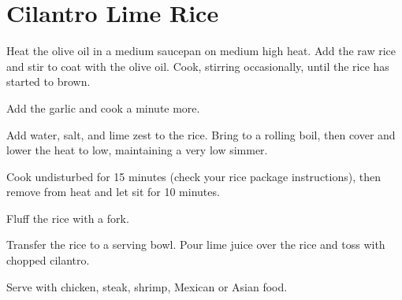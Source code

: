 \section{Cilantro Lime Rice}
\begin{recipe}
	
	

Heat the olive oil in a medium saucepan on medium high heat. Add the raw rice and stir to coat with the olive oil. Cook, stirring occasionally, until the rice has started to brown.

Add the garlic and cook a minute more.

Add water, salt, and lime zest to the rice. Bring to a rolling boil, then cover and lower the heat to low, maintaining a very low simmer.

Cook undisturbed for 15 minutes (check your rice package instructions), then remove from heat and let sit for 10 minutes.

Fluff the rice with a fork.

Transfer the rice to a serving bowl. Pour lime juice over the rice and toss with chopped cilantro.

Serve with chicken, steak, shrimp, Mexican or Asian food.

	
	
\end{recipe}

